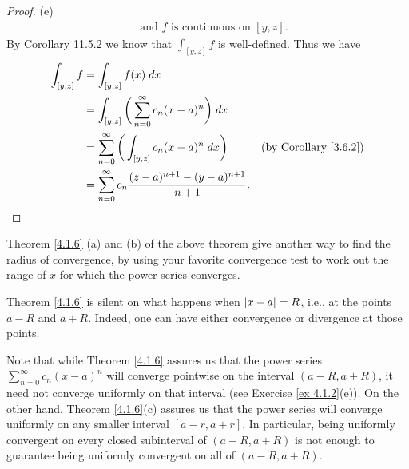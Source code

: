 \begin{proof}{(e)}
\begin{align*}
         & \text{ and } f \text{ is continuous on } [y, z].
    \end{align*}
    By Corollary 11.5.2 we know that \(\int_{[y, z]} f\) is well-defined.
    Thus we have
    \begin{align*}
        \int_{[y, z]} f & = \int_{[y, z]} f(x) \; dx                                                                                     \\
                        & = \int_{[y, z]} \bigg(\sum_{n = 0}^\infty c_n (x - a)^n\bigg) \; dx                                            \\
                        & = \sum_{n = 0}^\infty \bigg(\int_{[y, z]} c_n (x - a)^n \; dx\bigg)        & \text{(by Corollary \ref{3.6.2})} \\
                        & = \sum_{n = 0}^\infty c_n \frac{(z - a)^{n + 1} - (y - a)^{n + 1}}{n + 1}.
    \end{align*}
\end{proof}

\begin{note}
    Theorem \ref{4.1.6} (a) and (b) of the above theorem give another way to find the radius of convergence, by using your favorite convergence test to work out the range of \(x\) for which the power series converges.
\end{note}

\setcounter{theorem}{7}
\begin{remark}\label{4.1.8}
    Theorem \ref{4.1.6} is silent on what happens when \(\left\lvert x - a\right\rvert = R\), i.e., at the points \(a - R\) and \(a + R\).
    Indeed, one can have either convergence or divergence at those points.
\end{remark}

\begin{remark}\label{4.1.9}
    Note that while Theorem \ref{4.1.6} assures us that the power series \(\sum_{n = 0}^\infty c_n (x - a)^n\) will converge pointwise on the interval \((a - R, a + R)\), it need not converge uniformly on that interval
    (see Exercise \ref{ex 4.1.2}(e)).
    On the other hand, Theorem \ref{4.1.6}(c) assures us that the power series will converge uniformly on any smaller interval \([a - r, a + r]\).
    In particular, being uniformly convergent on every closed subinterval of \((a - R, a + R)\) is not enough to guarantee being uniformly convergent on all of \((a - R, a + R)\).
\end{remark}

\exercisesection

